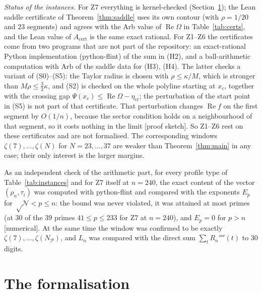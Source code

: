 \documentclass[11pt]{amsart}
\theoremstyle{definition}
\theoremstyle{remark}
\numberwithin{equation}{section}
\newcommand{\cN}{\mathcal{N}}
\newcommand{\cP}{\mathcal{P}}
\newcommand{\Acert}{A_{\mathrm{cert}}}
\renewcommand{\Re}{\operatorname{Re}}
\begin{document}
\emph{Status of the instances.} For Z7 everything is kernel-checked (Section~\ref{sec:lean}); the Lean saddle
certificate of Theorem~\ref{thm:saddle} uses its own contour (with $\rho=1/20$ and $23$ segments) and agrees with the
Arb value of $\Re\Omega$ in Table~\ref{tab:certs}, and the Lean value of $\Acert$ is the same exact rational. For
Z1--Z6 the certificates come from two programs that are not part of the repository: an exact-rational Python
implementation (python-flint) of the sum in (H2), and a ball-arithmetic computation with Arb of the saddle data for
(H3), (H4). The latter checks a variant of (S0)--(S5): the Taylor radius is chosen with $\rho\le\kappa/M$, which is
stronger than $M\rho\le\frac32\kappa$, and (S2) is checked on the whole polyline starting at $x_c$, together with the
crossing gap $\Psi(x_c)\le\Re\Omega-\eta_{\mathrm{cr}}$; the perturbation of the start point in (S5) is not part of
that certificate. That perturbation changes $\Re f$ on the first segment by $O(1/n)$, because the sector condition
holds on a neighbourhood of that segment, so it costs nothing in the limit [proof sketch]. So Z1--Z6 rest on these
certificates and are not formalised. The corresponding windows $\zeta(7),\dots,\zeta(N)$ for $N=23,\dots,37$ are weaker than
Theorem~\ref{thm:main} in any case; their only interest is the larger margins.

As an independent check of the arithmetic part, for every profile type of Table~\ref{tab:instances} and for Z7
itself at $n=240$, the exact content of the vector $(\rho_n,\tau_i)$ was computed with python-flint and compared with
the exponents $E_p$ for $\sqrt\cN<p\le n$: the bound was never violated, it was attained at most primes (at $30$ of
the $39$ primes $41\le p\le233$ for Z7 at $n=240$), and $E_p=0$ for $p>n$ [numerical]. At the same time the window
was confirmed to be exactly $\zeta(7),\dots,\zeta(N_\cP)$, and $L_n$ was compared with the direct sum
$\sum_tR_n''''(t)$ to $30$ digits.

\section{The formalisation}\label{sec:lean}
\end{document}
